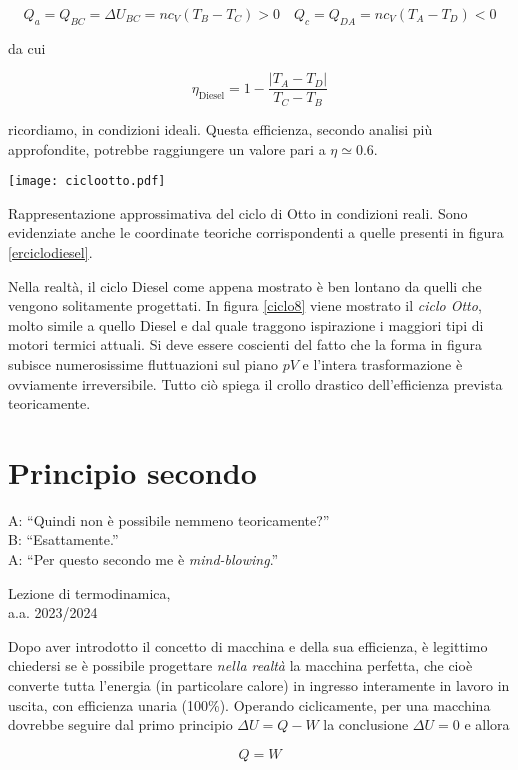 \[ Q_a = Q_{BC} = \Delta U_{BC} = nc_V(T_B - T_C) > 0 \quad Q_c = Q_{DA} = nc_V(T_A - T_D) < 0 \]

\noindent da cui

\[ \eta_\text{Diesel} = 1 - \frac{|T_A - T_D|}{T_C - T_B} \]

\noindent ricordiamo, in condizioni ideali. Questa efficienza,
secondo analisi più approfondite, potrebbe raggiungere un
valore pari a $\eta \simeq 0.6$.

\begin{marginfigure}
    \centering
    \texttt{[image: ciclootto.pdf]}
    \caption{Rappresentazione approssimativa del ciclo di Otto in
    condizioni reali. Sono evidenziate anche le coordinate teoriche
    corrispondenti a quelle presenti in figura \ref{erciclodiesel}.}
    \label{ciclo8}
\end{marginfigure}

Nella realtà, il ciclo Diesel come appena mostrato è ben lontano
da quelli che vengono solitamente progettati. In figura \ref{ciclo8}
viene mostrato il \textit{ciclo Otto}, molto simile a quello Diesel
e dal quale traggono ispirazione i maggiori tipi di motori termici
attuali. Si deve essere coscienti del fatto che la forma in figura
subisce numerosissime fluttuazioni sul piano $pV$ e l'intera trasformazione
è ovviamente irreversibile. Tutto ciò spiega il crollo drastico
dell'efficienza prevista teoricamente.






\section{Principio secondo}
\epigraph{A: ``Quindi non è possibile nemmeno teoricamente?''\\B: ``Esattamente.''\\A: ``Per questo secondo me è \emph{mind-blowing}.''}{Lezione di termodinamica,\\a.a. 2023/2024}

Dopo aver introdotto il concetto di macchina e della sua efficienza,
è legittimo chiedersi se è possibile progettare \textit{nella realtà}
la macchina perfetta, che cioè converte tutta l'energia
(in particolare calore) in ingresso interamente in lavoro in uscita,
con efficienza unaria (100\%).
Operando ciclicamente, per una macchina dovrebbe seguire dal primo
principio $\Delta U = Q - W$ la conclusione $\Delta U = 0$ e allora

\[ Q = W \]

